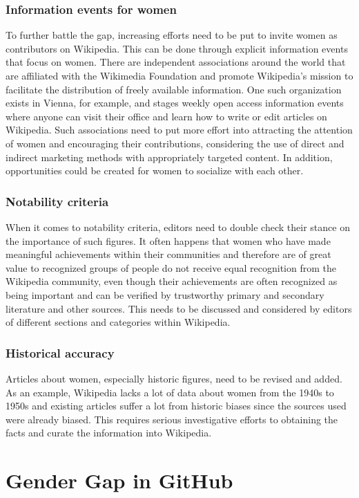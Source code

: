 \documentclass[a4paper, 11pt]{article}
\begin{document}
\subsubsection{Information events for women} \label{sec:gender-gap-wikipedia:infoevents}
To further battle the gap, increasing efforts need to be put to invite women as contributors on Wikipedia. This can be done through explicit information events that focus on women. There are independent associations around the world that are affiliated with the Wikimedia Foundation and promote Wikipedia's mission to facilitate the distribution of freely available information. One such organization exists in Vienna, for example, and stages weekly open access information events where anyone can visit their office and learn how to write or edit articles on Wikipedia. Such associations need to put more effort into attracting the attention of women and encouraging their contributions, considering the use of direct and indirect marketing methods with appropriately targeted content. In addition, opportunities could be created for women to socialize with each other.

\subsubsection{Notability criteria} \label{sec:gender-gap-wikipedia:fixnotability}
When it comes to notability criteria, editors need to double check their stance on the importance of such figures. It often happens that women who have made meaningful achievements within their communities and therefore are of great value to recognized groups of people do not receive equal recognition from the Wikipedia community, even though their achievements are often recognized as being important and can be verified by trustworthy primary and secondary literature and other sources. This needs to be discussed and considered by editors of different sections and categories within Wikipedia.

\subsubsection{Historical accuracy} \label{sec:gender-gap-wikipedia:historyaccuracy}
Articles about women, especially historic figures, need to be revised and added. As an example, Wikipedia lacks a lot of data about women from the 1940s to 1950s and existing articles suffer a lot from historic biases since the sources used were already biased. This requires serious investigative efforts to obtaining the facts and curate the information into Wikipedia.

\section{Gender Gap in GitHub} \label{sec:gender-gap-github}




\doclicenseThis
\end{document}
